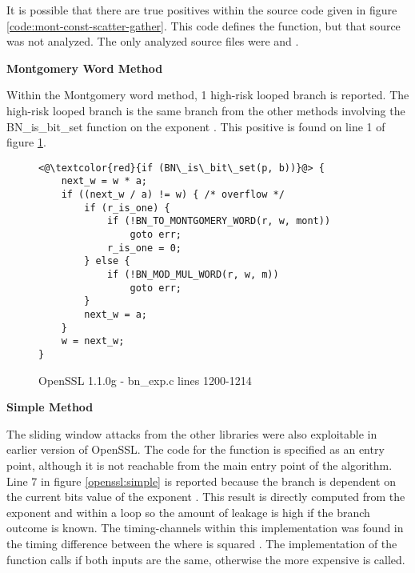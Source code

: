 It is possible that there are true positives within the source code given in
figure \ref{code:mont-const-scatter-gather}. This code defines the
 function, but that source was not analyzed. The only
analyzed source files were  and .

\noindent
\textbf{Montgomery Word Method}


Within the Montgomery word method, 1 high-risk looped branch is reported. The
  high-risk looped branch is the same branch from the other methods involving the
  BN\_is\_bit\_set function on the exponent . This positive is found
  on line 1 of figure \ref{code:mont-word-is-bit-set}.

  \begin{figure}
    \begin{lstlisting}
<@\textcolor{red}{if (BN\_is\_bit\_set(p, b))}@> {
    next_w = w * a;
    if ((next_w / a) != w) { /* overflow */
        if (r_is_one) {
            if (!BN_TO_MONTGOMERY_WORD(r, w, mont))
                goto err;
            r_is_one = 0;
        } else {
            if (!BN_MOD_MUL_WORD(r, w, m))
                goto err;
        }
        next_w = a;
    }
    w = next_w;
}
    \end{lstlisting}
    \caption{OpenSSL 1.1.0g - bn\_exp.c lines 1200-1214}
    \label{code:mont-word-is-bit-set}
  \end{figure}


  \noindent
  \textbf{Simple Method}

  The sliding window attacks from the other libraries were also exploitable
  in earlier version of OpenSSL. The code for the function  is
  specified as an entry point, although it is not reachable from the
  main entry point of the algorithm. Line 7 in figure \ref{openssl:simple} is reported
  because the branch is dependent on the current bits value of the exponent
  . This result is directly computed from the exponent and within a
  loop so the amount of leakage is high if the branch outcome is known. The
  timing-channels within this implementation was found in the timing difference
  between the  where  is squared
  \cite{percival2005cache}. The implementation of the 
  function calls  if both inputs are the same, otherwise the
  more expensive  is called.


